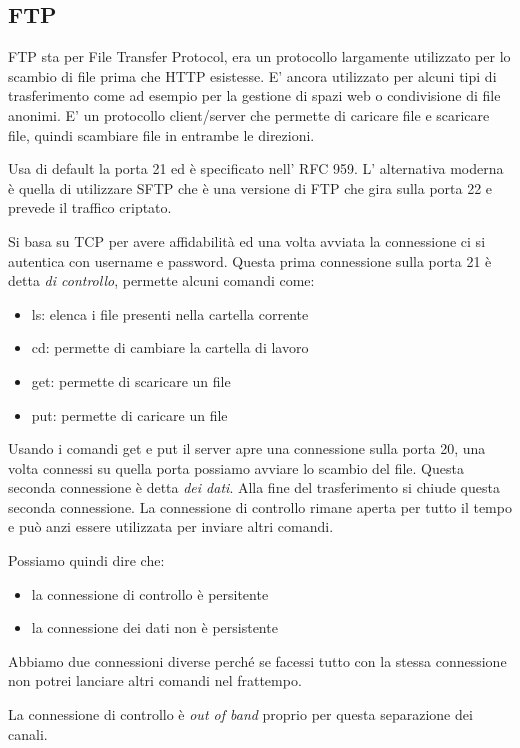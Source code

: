 \subsection{FTP}
FTP sta per File Transfer Protocol, era un protocollo largamente utilizzato per lo scambio di file prima che HTTP esistesse.
E' ancora utilizzato per alcuni tipi di trasferimento come ad esempio per la gestione di spazi web o condivisione di file anonimi.
E' un protocollo client/server che permette di caricare file e scaricare file, quindi scambiare file in entrambe le direzioni.

Usa di default la porta 21 ed è specificato nell' RFC 959.
L' alternativa moderna è quella di utilizzare SFTP che è una versione di FTP che gira sulla porta 22 e prevede il traffico criptato.

Si basa su TCP per avere affidabilità ed una volta avviata la connessione ci si autentica con username e password.
Questa prima connessione sulla porta 21 è detta \emph{di controllo}, permette alcuni comandi come:
\begin{itemize}
    \item ls: elenca i file presenti nella cartella corrente
    \item cd: permette di cambiare la cartella di lavoro
    \item get: permette di scaricare un file
    \item put: permette di caricare un file
\end{itemize}

Usando i comandi get e put il server apre una connessione sulla porta 20, una volta connessi su quella porta possiamo avviare lo scambio del file.
Questa seconda connessione è detta \emph{dei dati}.
Alla fine del trasferimento si chiude questa seconda connessione.
La connessione di controllo rimane aperta per tutto il tempo e può anzi essere utilizzata per inviare altri comandi.

Possiamo quindi dire che:
\begin{itemize}
    \item la connessione di controllo è persitente
    \item la connessione dei dati non è persistente
\end{itemize}

Abbiamo due connessioni diverse perché se facessi tutto con la stessa connessione non potrei lanciare altri comandi nel frattempo.

La connessione di controllo è \emph{out of band} proprio per questa separazione dei canali.

